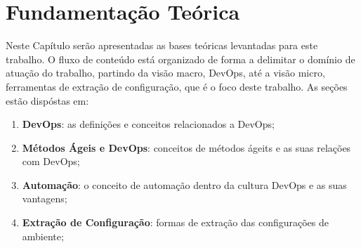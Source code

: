 \newpage\null\thispagestyle{empty}\newpage
\chapter{Fundamentação Teórica}
\label{chap:teoria}

Neste Capítulo serão apresentadas as bases teóricas levantadas para este trabalho.
O fluxo de conteúdo está organizado de forma a delimitar o domínio de atuação
do trabalho, partindo da visão macro, DevOps, até a visão micro, ferramentas de
extração de configuração, que é o foco deste trabalho. As seções estão dispóstas em:

\begin{enumerate}
  \item \textbf{DevOps}: as definições e conceitos relacionados a DevOps;
  \item \textbf{Métodos Ágeis e DevOps}: conceitos de métodos ágeits e as suas relações com DevOps;
  \item \textbf{Automação}: o conceito de automação dentro da cultura DevOps e as suas vantagens;
  \item \textbf{Extração de Configuração}: formas de extração das configurações de ambiente;
\end{enumerate}




